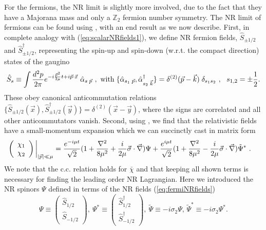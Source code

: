 \documentclass[11pt]{article}
\def\Z{{\mathbb Z}}
\begin{document}
For the fermions, the NR limit is slightly more involved, due to the fact that they have a  Majorana mass and only a $\Z_2$ fermion number symmetry. The NR limit of fermions can be found using \cite{Dreiner:2008tw}, with an end result as we now describe. First,  in complete analogy with (\ref{eq:scalarNRfields1}),  we define NR fermion fields, $\hat S_{\pm 1/2}$ and $\hat S^\dagger_{\pm 1/2}$, representing the spin-up and spin-down (w.r.t. the compact direction) states of the  gaugino 
\begin{equation}
\label{eq:fermiNRfields}
 \hat S_{s} \equiv \int {d^2 p \over 2 \pi}  e^{ - i \frac{\vec{p}^2}{2\mu}t + i \vec{p} \cdot\vec{x}} \; \hat\alpha_{s\; \vec{p}} ~, ~ {\rm with} \; \{ \hat\alpha_{s_1\; \vec{p}}, \hat\alpha^\dagger_{s_2 \; \vec{k}} \} = \delta^{(2)}(\vec{p} - \vec{k}) \; \delta_{s_1 s_2}~, ~~s_{1,2} = \pm {1 \over 2}.
 \end{equation}  These obey canonical anticommutation relations $\{ \hat S_{\pm 1/2} (\vec{x}), \hat S_{\pm 1/2}^\dagger (\vec{y}) \} = \delta^{(2)}( \vec{x} - \vec{y})$, where the signs are correlated and all other anticommutators vanish. Second, using \cite{Dreiner:2008tw}, we find that the relativistic fields  have a small-momentum expansion which we can succinctly cast  
 in matrix form
 \begin{align} 
 \label{eq:chiNR3}
 \left( \begin{array}{c} \chi_1 \\ \chi_2 \end{array} \right)\bigg\vert_{|\vec{p}| \ll \mu} &= {e^{- i \mu t} \over \sqrt{2}}( 1 + {\nabla^2 \over 8 \mu^2} + {i \over 2 \mu}  {\vec\sigma} \cdot  {\vec\nabla}) \Psi +  {e^{  i \mu t} \over \sqrt{2}} ( 1 + {\nabla^2 \over 8 \mu^2}- {i \over 2 \mu}  {\vec\sigma} \cdot  {\vec\nabla} ) \tilde\Psi^*~.
  \end{align}
We note that the c.c. relation holds for $\bar\chi$ and that keeping all shown terms is necessary for finding the leading order NR Lagrangian.
Here we introduced the NR spinors $\Psi$ defined in terms of the NR fields (\ref{eq:fermiNRfields}) \begin{equation}
 \label{eq:psiNR}
 \Psi \equiv \left(\begin{array}{c} \hat S_{1/2} \\ \hat S_{-1/2}\end{array} \right), ~ \Psi^* \equiv \left(\begin{array}{c} \hat S^\dagger_{1/2} \\ \hat S^\dagger_{-1/2}\end{array} \right), ~ \tilde\Psi \equiv - i \sigma_2 \Psi ,\, \tilde\Psi^* \equiv - i \sigma_2 \Psi^*. \nonumber
 \end{equation}
 
\end{document}
